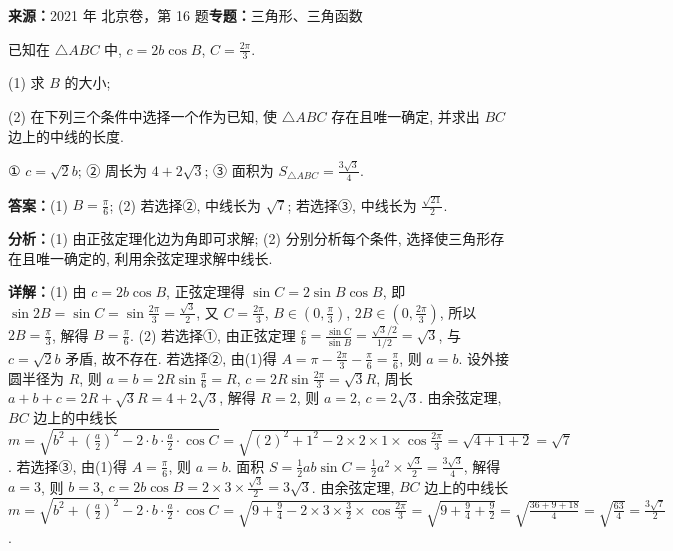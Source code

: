 \begin{question}[points=13]
\textbf{来源：}2021 年 北京卷，第 16 题\quad \textbf{专题：}三角形、三角函数\par
已知在 $\triangle ABC$ 中, $c=2b\cos B$, $C=\frac{2\pi}{3}$.

(1) 求 $B$ 的大小;

(2) 在下列三个条件中选择一个作为已知, 使 $\triangle ABC$ 存在且唯一确定, 并求出 $BC$ 边上的中线的长度.

① $c=\sqrt{2}b$; ② 周长为 $4+2\sqrt{3}$; ③ 面积为 $S_{\triangle ABC}=\frac{3\sqrt{3}}{4}$.
\begin{solution}
\textbf{答案：}(1) $B=\frac{\pi}{6}$; (2) 若选择②, 中线长为 $\sqrt{7}$; 若选择③, 中线长为 $\frac{\sqrt{21}}{2}$.

\textbf{分析：}(1) 由正弦定理化边为角即可求解; (2) 分别分析每个条件, 选择使三角形存在且唯一确定的, 利用余弦定理求解中线长.

\textbf{详解：}(1) 由 $c=2b\cos B$, 正弦定理得 $\sin C=2\sin B\cos B$, 即 $\sin 2B=\sin C=\sin\frac{2\pi}{3}=\frac{\sqrt{3}}{2}$, 又 $C=\frac{2\pi}{3}$, $B\in(0,\frac{\pi}{3})$, $2B\in(0,\frac{2\pi}{3})$, 所以 $2B=\frac{\pi}{3}$, 解得 $B=\frac{\pi}{6}$.
(2) 若选择①, 由正弦定理 $\frac{c}{b}=\frac{\sin C}{\sin B}=\frac{\sqrt{3}/2}{1/2}=\sqrt{3}$, 与 $c=\sqrt{2}b$ 矛盾, 故不存在.
若选择②, 由(1)得 $A=\pi-\frac{2\pi}{3}-\frac{\pi}{6}=\frac{\pi}{6}$, 则 $a=b$. 设外接圆半径为 $R$, 则 $a=b=2R\sin\frac{\pi}{6}=R$, $c=2R\sin\frac{2\pi}{3}=\sqrt{3}R$, 周长 $a+b+c=2R+\sqrt{3}R=4+2\sqrt{3}$, 解得 $R=2$, 则 $a=2$, $c=2\sqrt{3}$. 由余弦定理, $BC$ 边上的中线长 $m=\sqrt{b^2+(\frac{a}{2})^2-2\cdot b\cdot\frac{a}{2}\cdot\cos C}=\sqrt{(2)^2+1^2-2\times2\times1\times\cos\frac{2\pi}{3}}=\sqrt{4+1+2}=\sqrt{7}$.
若选择③, 由(1)得 $A=\frac{\pi}{6}$, 则 $a=b$. 面积 $S=\frac{1}{2}ab\sin C=\frac{1}{2}a^2\times\frac{\sqrt{3}}{2}=\frac{3\sqrt{3}}{4}$, 解得 $a=3$, 则 $b=3$, $c=2b\cos B=2\times3\times\frac{\sqrt{3}}{2}=3\sqrt{3}$. 由余弦定理, $BC$ 边上的中线长 $m=\sqrt{b^2+(\frac{a}{2})^2-2\cdot b\cdot\frac{a}{2}\cdot\cos C}=\sqrt{9+\frac{9}{4}-2\times3\times\frac{3}{2}\times\cos\frac{2\pi}{3}}=\sqrt{9+\frac{9}{4}+\frac{9}{2}}=\sqrt{\frac{36+9+18}{4}}=\sqrt{\frac{63}{4}}=\frac{3\sqrt{7}}{2}$.
\end{solution}
\end{question}

